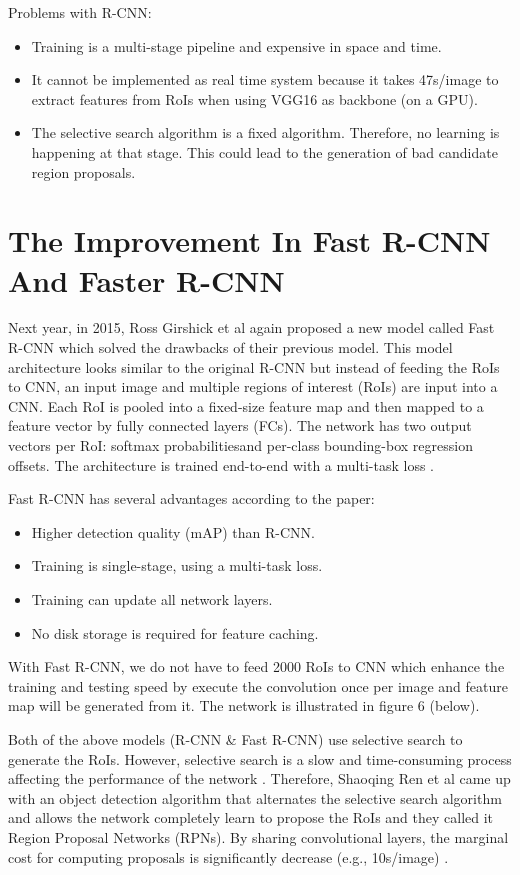 	
	Problems with R-CNN:
	\begin{itemize}
		\item Training is a multi-stage pipeline and expensive in space and time.
		\item It cannot be implemented as real time system because it takes 47s/image to extract features from RoIs when using VGG16 as backbone (on a GPU).
		\item The selective search algorithm is a fixed algorithm. Therefore, no learning is happening at that stage. This could lead to the generation of bad candidate region proposals.
	\end{itemize}

\section{The Improvement In Fast R-CNN And Faster R-CNN}
\label{section:fastandfasterrcnn}
\noindent
	
	Next year, in 2015, Ross Girshick et al again proposed a new model called Fast R-CNN which solved the drawbacks of their previous model. This model architecture looks similar to the original R-CNN but instead of feeding the RoIs to CNN, an input image and multiple regions of interest (RoIs) are input into a CNN. Each RoI is pooled into a fixed-size feature map and then mapped to a feature vector by fully connected layers (FCs). The network has two output vectors per RoI: softmax probabilitiesand per-class bounding-box regression offsets. The architecture is trained end-to-end with a multi-task loss \cite{fastrcnn}.
	
	Fast R-CNN has several advantages according to the paper:
	\begin{itemize}
		\item Higher detection quality (mAP) than R-CNN.
		\item Training is single-stage, using a multi-task loss.
		\item Training can update all network layers.
		\item No disk storage is required for feature caching.
	\end{itemize}
	
	With Fast R-CNN, we do not have to feed 2000 RoIs to CNN which enhance the training and testing speed by execute the convolution once per image and feature map will be generated from it. The network is illustrated in figure 6 (below).
	
	Both of the above models (R-CNN \& Fast R-CNN) use selective search to generate the RoIs. However, selective search is a slow and time-consuming process affecting the performance of the network \cite{fasterrcnn}. Therefore, Shaoqing Ren et al came up with an object detection algorithm that alternates the selective search algorithm and allows the network completely learn to propose the RoIs and they called it Region Proposal Networks (RPNs). By sharing convolutional layers, the marginal cost for computing proposals is significantly decrease (e.g., 10s/image) \cite{fasterrcnn}.
	
